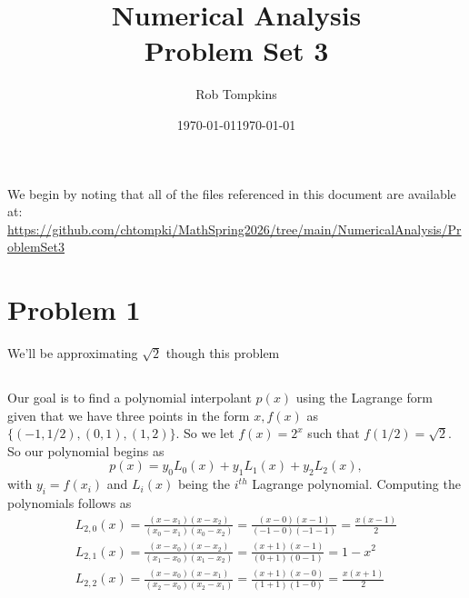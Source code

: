 \documentclass[12pt]{amsart}
\title{Numerical Analysis\\Problem Set 3}
\author{Rob Tompkins}
\date{\today}
\begin{document}
    \maketitle
    \date{\today}
    \begin{onehalfspace}
        We begin by noting that all of the files referenced in this document are available at: \\
        \underline{https://github.com/chtompki/MathSpring2026/tree/main/NumericalAnalysis/ProblemSet3}

        \section{Problem 1}
        We'll be approximating $\sqrt{2}$ though this problem

        \subsection{}
        Our goal is to find a polynomial interpolant $p(x)$ using the Lagrange form given that we have
        three points in the form $x,f(x)$ as $\{(-1,1/2), (0,1), (1,2)\}$. So we let $f(x) = 2^x$ such that
        $f(1/2) = \sqrt{2}$. So our polynomial begins as
        \[
            p(x) = y_0 L_0(x) + y_1 L_1(x) + y_2 L_2(x),
        \]
        with $y_i = f(x_i)$ and $L_i(x)$ being the $i^{th}$ Lagrange polynomial.
        Computing the polynomials follows as
        \begin{gather*}
            L_{2,0}(x) = \frac{(x-x_1)(x-x_2)}{(x_0-x_1)(x_0-x_2)} = \frac{(x-0)(x-1)}{(-1-0)(-1-1)} = \frac{x(x-1)}{2}\\
            L_{2,1}(x) = \frac{(x-x_0)(x-x_2)}{(x_1-x_0)(x_1-x_2)} = \frac{(x+1)(x-1)}{(0+1)(0-1)} = 1-x^2\\
            L_{2,2}(x) = \frac{(x-x_0)(x-x_1)}{(x_2-x_0)(x_2-x_1)} = \frac{(x+1)(x-0)}{(1+1)(1-0)} = \frac{x(x+1)}{2}
        \end{gather*}


\end{onehalfspace}
\end{document}
